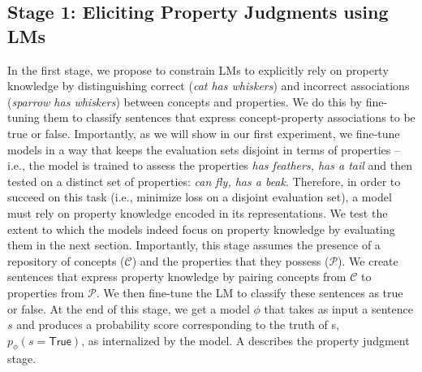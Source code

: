 \documentclass[10pt,letterpaper]{article}
\newcommand{\km}[1]{\textcolor{purple}{$_{KM}$[#1]}}
\newcommand{\concepts}{\mathcal{C}}
\newcommand{\properties}{\mathcal{P}}
\begin{document}
\subsection{Stage 1: Eliciting Property Judgments using LMs}
In the first stage, we propose to constrain LMs to explicitly rely on property knowledge by distinguishing correct (\textit{cat has whiskers}) and incorrect associations (\textit{sparrow has whiskers}) between concepts and properties. 
We do this by fine-tuning them to classify sentences that express concept-property associations to be true or false. Importantly, as we will show in our first experiment, we fine-tune models in a way that keeps the evaluation sets disjoint in terms of properties -- i.e., the model is trained to assess the properties \textit{has feathers, has a tail} and then tested on a distinct set of properties: \textit{can fly, has a beak}.
Therefore, in order to succeed on this task (i.e., minimize loss on a disjoint evaluation set), a model must rely on property knowledge encoded in its representations.
We test the extent to which the models indeed focus on property knowledge by evaluating them in the next section. 
Importantly, this stage assumes the presence of a repository of concepts ($\concepts$) and the properties that they possess ($\properties$). 
We create sentences that express property knowledge by pairing concepts from $\concepts$ to properties from $\properties$. We then fine-tune the LM to classify these sentences as true or false. At the end of this stage, we get a model $\phi$ that takes as input a sentence $s$ and produces a probability score corresponding to the truth of s, $p_{\phi}(s = \mathsf{True})$, as internalized by the model.
A describes the property judgment stage.
\end{document}
